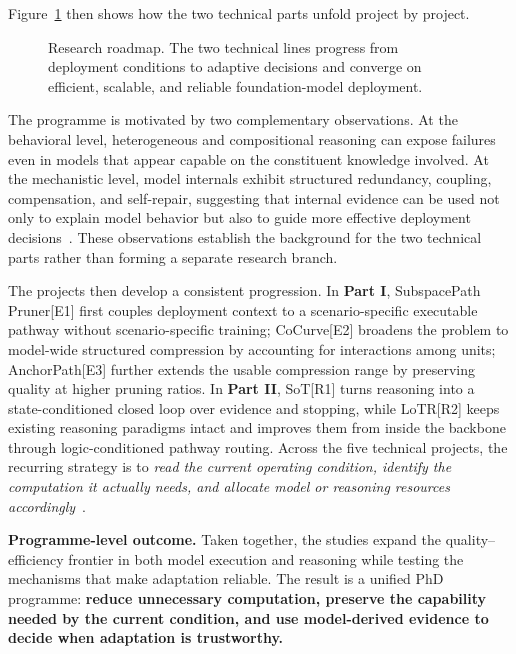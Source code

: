 \documentclass[12pt,a4paper]{article}
\newcommand{\method}[1]{{\sffamily\bfseries\color{MethodBlue}#1}}
\newcommand{\XDB}{\method{XDomainBench}}
\newcommand{\SubspacePath}{\method{SubspacePath Pruner}}
\newcommand{\CoCurve}{\method{CoCurve}}
\newcommand{\AnchorPath}{\method{AnchorPath}}
\newcommand{\CoAx}{\method{CoAx}}
\newcommand{\SoT}{\method{SoT}}
\newcommand{\LoTR}{\method{LoTR}}
\newcommand{\EtoE}{\method{E2E-Merge}}
\newcommand{\workref}[2]{\kern0.14em\hyperref[#2]{\textcolor{NTUred}{\textsf{\bfseries\scriptsize[#1]}}}}
\def\method#1{#1}\def\XDB{XDomainBench}\def\SubspacePath{SubspacePath Pruner}%
\def\CoCurve{CoCurve}\def\AnchorPath{AnchorPath}\def\CoAx{CoAx}%
\def\SoT{SoT}\def\LoTR{LoTR}\def\EtoE{E2E-Merge}%
\def\workref#1#2{[#1]}%
\begin{document}
Figure~\ref{fig:qe_overview} then shows how the two technical parts unfold project by project.
\begin{figure}[H]
\centering
\resizebox{0.86\textwidth}{!}{}
\caption{Research roadmap. The two technical lines progress from deployment conditions to adaptive decisions and converge on efficient, scalable, and reliable foundation-model deployment.}
\label{fig:qe_overview}
\end{figure}

The programme is motivated by two complementary observations. At the behavioral level, heterogeneous and compositional reasoning can expose failures even in models that appear capable on the constituent knowledge involved. At the mechanistic level, model internals exhibit structured redundancy, coupling, compensation, and self-repair, suggesting that internal evidence can be used not only to explain model behavior but also to guide more effective deployment decisions~\citep{gong2026xdomainbench,gong2026coax}. These observations establish the background for the two technical parts rather than forming a separate research branch.

The projects then develop a consistent progression. In \textbf{Part I}, \SubspacePath{}\workref{E1}{sec:subspace} first couples deployment context to a scenario-specific executable pathway without scenario-specific training; \CoCurve{}\workref{E2}{sec:cocurve} broadens the problem to model-wide structured compression by accounting for interactions among units; \AnchorPath{}\workref{E3}{sec:anchor} further extends the usable compression range by preserving quality at higher pruning ratios. In \textbf{Part II}, \SoT{}\workref{R1}{sec:sot} turns reasoning into a state-conditioned closed loop over evidence and stopping, while \LoTR{}\workref{R2}{sec:lotr} keeps existing reasoning paradigms intact and improves them from inside the backbone through logic-conditioned pathway routing. Across the five technical projects, the recurring strategy is to \emph{read the current operating condition, identify the computation it actually needs, and allocate model or reasoning resources accordingly}~\citep{gong2026subspacepath,gong2026cocurve,gong2026anchorpath,gong2026sot,gong2026lotr}.

\begin{thesisbox}
\textbf{Programme-level outcome.} Taken together, the studies expand the quality--efficiency frontier in both model execution and reasoning while testing the mechanisms that make adaptation reliable. The result is a unified PhD programme: \textbf{reduce unnecessary computation, preserve the capability needed by the current condition, and use model-derived evidence to decide when adaptation is trustworthy.}
\end{thesisbox}
\end{document}
